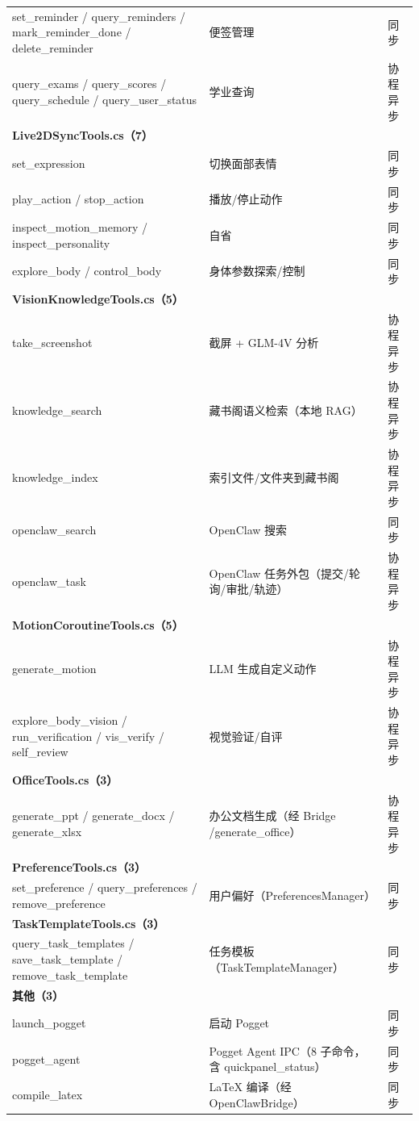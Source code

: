 \documentclass[12pt,a4paper]{ctexart}
\begin{document}
\begin{longtable}{lll}
set\_reminder / query\_reminders / mark\_reminder\_done / delete\_reminder & 便签管理 & 同步 \\
query\_exams / query\_scores / query\_schedule / query\_user\_status & 学业查询 & 协程异步 \\
\multicolumn{3}{l}{\textbf{Live2DSyncTools.cs（7）}} \\
set\_expression & 切换面部表情 & 同步 \\
play\_action / stop\_action & 播放/停止动作 & 同步 \\
inspect\_motion\_memory / inspect\_personality & 自省 & 同步 \\
explore\_body / control\_body & 身体参数探索/控制 & 同步 \\
\multicolumn{3}{l}{\textbf{VisionKnowledgeTools.cs（5）}} \\
take\_screenshot & 截屏 + GLM-4V 分析 & 协程异步 \\
knowledge\_search & 藏书阁语义检索（本地 RAG） & 协程异步 \\
knowledge\_index & 索引文件/文件夹到藏书阁 & 协程异步 \\
openclaw\_search & OpenClaw 搜索 & 同步 \\
openclaw\_task & OpenClaw 任务外包（提交/轮询/审批/轨迹） & 协程异步 \\
\multicolumn{3}{l}{\textbf{MotionCoroutineTools.cs（5）}} \\
generate\_motion & LLM 生成自定义动作 & 协程异步 \\
explore\_body\_vision / run\_verification / vis\_verify / self\_review & 视觉验证/自评 & 协程异步 \\
\multicolumn{3}{l}{\textbf{OfficeTools.cs（3）}} \\
generate\_ppt / generate\_docx / generate\_xlsx & 办公文档生成（经 Bridge /generate\_office） & 协程异步 \\
\multicolumn{3}{l}{\textbf{PreferenceTools.cs（3）}} \\
set\_preference / query\_preferences / remove\_preference & 用户偏好（PreferencesManager） & 同步 \\
\multicolumn{3}{l}{\textbf{TaskTemplateTools.cs（3）}} \\
query\_task\_templates / save\_task\_template / remove\_task\_template & 任务模板（TaskTemplateManager） & 同步 \\
\multicolumn{3}{l}{\textbf{其他（3）}} \\
launch\_pogget & 启动 Pogget & 同步 \\
pogget\_agent & Pogget Agent IPC（8 子命令，含 quickpanel\_status） & 同步 \\
compile\_latex & LaTeX 编译（经 OpenClawBridge） & 同步 \\
\bottomrule
\end{longtable}
\end{document}
